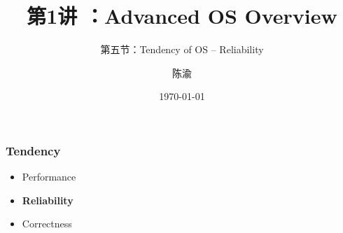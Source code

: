 


\title[第1讲]{第1讲 ：Advanced OS Overview} %
\subtitle{第五节：Tendency of OS -- Reliability}
\author{陈渝} %
\date{\today} %




\begin{frame}
\titlepage %
\end{frame}

%
%
\begin{frame}
	\frametitle{Tendency}

	\begin{itemize}\huge
	\item Performance
	\item \textbf{Reliability}
	\item Correctness
	
\end{itemize}
\end{frame}


